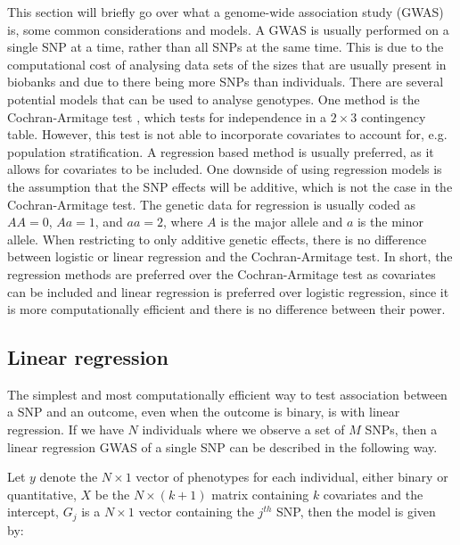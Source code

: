 This section will briefly go over what a genome-wide association study (GWAS) is, some common considerations and models. A GWAS is usually performed on a single SNP at a time, rather than all SNPs at the same time. This is due to the computational cost of analysing data sets of the sizes that are usually present in biobanks and due to there being more SNPs than individuals. There are several potential models that can be used to analyse genotypes. One method is the Cochran-Armitage test \cite{cochran1954some,armitageTest}, which tests for independence in a $ 2\times 3 $ contingency table. However, this test is not able to incorporate covariates to account for, e.g. population stratification. A regression based method is usually preferred, as it allows for covariates to be included. One downside of using regression models is the assumption that the SNP effects will be additive, which is not the case in the Cochran-Armitage test. The genetic data for regression is usually coded as $ AA = 0 $, $ Aa = 1 $, and $ aa = 2 $, where $ A $ is the major allele and $ a $ is the minor allele\cite{zeng2015statistical}. When restricting to only additive genetic effects, there is no difference between logistic or linear regression and the Cochran-Armitage test. In short, the regression methods are preferred over the Cochran-Armitage test as covariates can be included and linear regression is preferred over logistic regression, since it is more computationally efficient and there is no difference between their power\cite{sikorska2013gwas,prive2019makingbalding2006tutorial}.


\subsection{Linear regression}
The simplest and most computationally efficient way to test association between a SNP and an outcome, even when the outcome is binary, is with linear regression. If we have $ N $ individuals where we observe a set of $ M $ SNPs, then a linear regression GWAS of a single SNP can be described in the following way.

Let $ y $ denote the $ N\times1 $ vector of phenotypes for each individual, either binary or quantitative, $ X $ be the $ N \times (k+1) $ matrix containing $ k $ covariates and the intercept, $ G_j $ is a $ N\times 1 $ vector containing the $ j^{th} $ SNP, then the model is given by:

